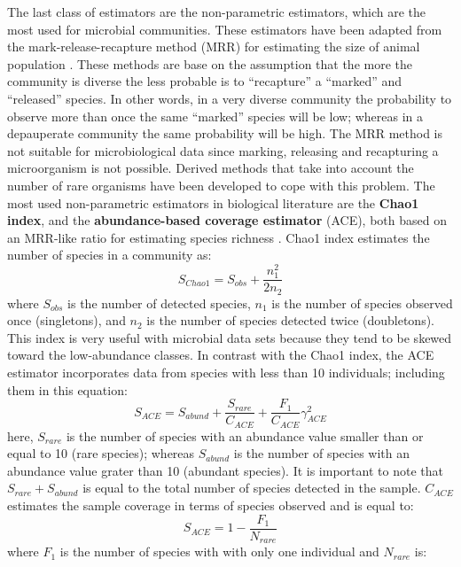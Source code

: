 The last class of estimators are the non-parametric estimators, which are the most used for microbial communities. These estimators have been adapted from the mark-release-recapture method (MRR) for estimating the size of animal population \cite{fletcher2006analysis}.
These methods are base on the assumption that the more the community is diverse the less probable is to ``recapture'' a ``marked'' and ``released'' species. In other words, in a very diverse community the probability to observe more than once the same ``marked'' species will be low; whereas in a depauperate community the same probability will be high. The MRR method is not suitable for microbiological data since marking, releasing and recapturing a microorganism is not possible. Derived methods that take into account the number of rare organisms have been developed to cope with this problem. The most used non-parametric estimators in biological literature are the \textbf{Chao1 index}, and the \textbf{abundance-based coverage estimator} (ACE), both based on an MRR-like ratio for estimating species richness \cite{chao1984nonparametric, chao1993stopping, sogin2006microbial, roesch2007pyrosequencing}. Chao1 index estimates the number of species in a community as:
\begin{equation*}
S_{Chao1} = S_{obs} + \frac{n_1^2}{2n_2}
\end{equation*}
where $S_{obs}$ is the number of detected species, $n_1$ is the number of species observed once (singletons), and $n_2$ is the number of species detected twice (doubletons). This index is very useful with microbial data sets because they tend to be skewed toward the low-abundance classes. In contrast with the Chao1 index, the ACE estimator incorporates data from species with less than 10 individuals; including them in this equation:
\begin{equation*}
S_{ACE} = S_{abund} + \frac{S_{rare}}{C_{ACE}} + \frac{F_1}{C_{ACE}} \gamma_{ACE}^2
\end{equation*}
here, $S_{rare}$ is the number of species with an abundance value smaller than or equal to 10 (rare species); whereas $S_{abund}$ is the number of species with an abundance value grater than 10 (abundant species). It is important to note that $S_{rare} + S_{abund}$ is equal to the total number of species detected in the sample. $C_{ACE}$ estimates the sample coverage in terms of species observed and is equal to:
\begin{equation*}
S_{ACE} = 1 - \frac{F_1}{N_{rare}}
\end{equation*}
where $F_1$ is the number of species with with only one individual and $N_{rare}$ is:
